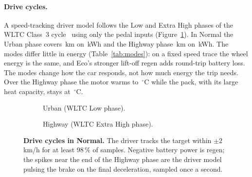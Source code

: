 \documentclass[10pt]{article}
\begin{document}
\paragraph{Drive cycles.} A speed-tracking driver model follows the Low and Extra High phases of the WLTC Class~3 cycle~\cite{unece_gtr15} using only the pedal inputs (Figure~\ref{fig:cycles}). In Normal the Urban phase covers \CycUrbanKm\,km on \CycUrbanKwh\,kWh and the Highway phase \CycHighwayKm\,km on \CycHighwayKwh\,kWh. The modes differ little in energy (Table~\ref{tab:modes}): on a fixed speed trace the wheel energy is the same, and Eco's stronger lift-off regen adds round-trip battery loss. The modes change how the car responds, not how much energy the trip needs. Over the Highway phase the motor warms to \CycHighwayMotorMaxC\,$^\circ$C while the pack, with its large heat capacity, stays at \CycHighwayPackMaxC\,$^\circ$C.

\begin{figure}[!htbp]
\centering
\begin{subfigure}[t]{0.49\textwidth}
\caption{Urban (WLTC Low phase).}
\end{subfigure}\hfill
\begin{subfigure}[t]{0.49\textwidth}
\caption{Highway (WLTC Extra High phase).}
\end{subfigure}
\caption{\textbf{Drive cycles in Normal.} The driver tracks the target within $\pm 2$\,km/h for at least 98\,\% of samples. Negative battery power is regen; the spikes near the end of the Highway phase are the driver model pulsing the brake on the final deceleration, sampled once a second.}
\label{fig:cycles}
\end{figure}
\end{document}
